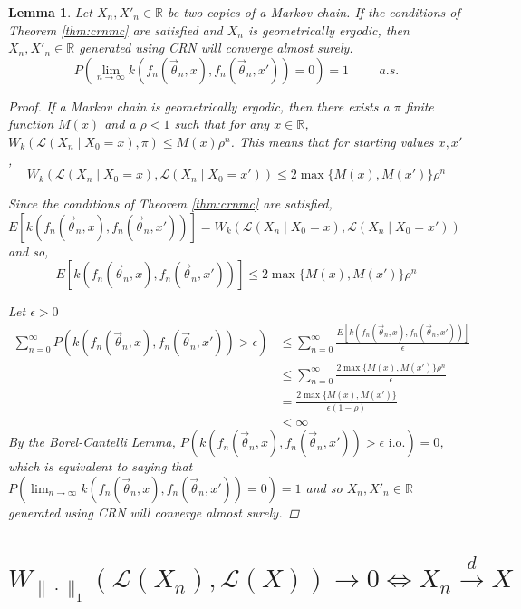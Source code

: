 \documentclass{article}
\theoremstyle{plain}%
\newtheorem{lemma}[theorem]{Lemma}
\theoremstyle{definition}
\theoremstyle{remark}
\begin{document}
	\begin{lemma}
		Let $X_n,X'_n\in \mathbb{R}$ be two copies of a Markov chain. If the conditions of Theorem \ref{thm:crnmc} are satisfied and $X_n$ is geometrically ergodic, then $X_n, X'_n\in \mathbb{R}$ generated using CRN will converge almost surely. 
		$$P(\lim_{n\to \infty}k(f_n(\vec{\theta}_n,x),f_n(\vec{\theta}_n,x'))=0)= 1\hspace{1cm} a.s.$$
		
		\begin{proof}
			If a Markov chain is geometrically ergodic, then there exists a $\pi$ finite function $M(x)$ and a $\rho<1$ such that for any $x\in \mathbb{R}$, $W_k(\mathcal{L}(X_n\mid X_0=x),\pi)\leq M(x)\rho^n$. This means that for starting values $x,x'$,
			$$W_k(\mathcal{L}(X_n\mid X_0=x),\mathcal{L}(X_n\mid X_0=x'))\leq 2\max\{M(x), M(x')\}\rho^n$$
			
			Since the conditions of Theorem \ref{thm:crnmc} are satisfied, $E[k(f_n(\vec{\theta}_n,x),f_n(\vec{\theta}_n,x'))]=W_k(\mathcal{L}(X_n\mid X_0=x),\mathcal{L}(X_n\mid X_0=x'))$ and so,
			$$E[k(f_n(\vec{\theta}_n,x),f_n(\vec{\theta}_n,x'))]\leq 2\max\{M(x), M(x')\}\rho^n$$
			
			Let $\epsilon>0$
			\begin{align*}
				\sum_{n=0}^{\infty}P(k(f_n(\vec{\theta}_n,x),f_n(\vec{\theta}_n,x'))>\epsilon)&\leq 	\sum_{n=0}^{\infty}\frac{E[k(f_n(\vec{\theta}_n,x),f_n(\vec{\theta}_n,x'))]}{\epsilon}\\
				&\leq \sum_{n=0}^{\infty}\frac{2\max\{M(x), M(x')\}\rho^n}{\epsilon}\\
				&=\frac{2\max\{M(x), M(x')\}}{\epsilon(1-\rho)}\\
				&<\infty
			\end{align*}
			By the Borel-Cantelli Lemma, $P(k(f_n(\vec{\theta}_n,x),f_n(\vec{\theta}_n,x'))>\epsilon \text{ i.o.})=0$, which is equivalent to saying that $P(\lim_{n\to\infty}k(f_n(\vec{\theta}_n,x),f_n(\vec{\theta}_n,x'))=0)=1$ and so $X_n, X'_n\in \mathbb{R}$ generated using CRN will converge almost surely. 
		\end{proof}
	\end{lemma}
	\section{ $W_{\|\cdot\|_1}(\mathcal{L}(X_n),\mathcal{L}(X))\to 0  \iff X_n\overset{d}{\to}X$ }
	
\end{document}
